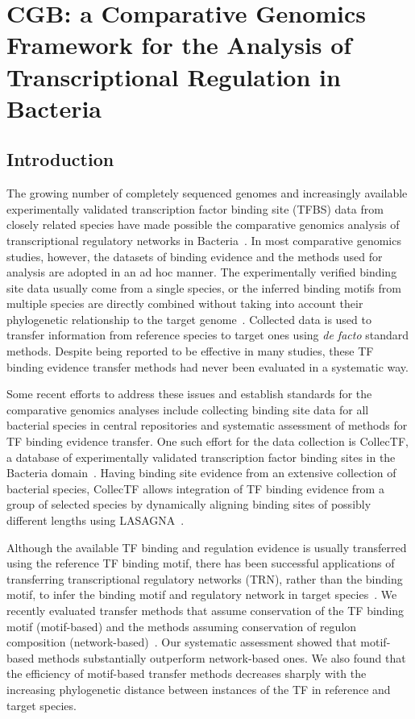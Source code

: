 \chapter{CGB: a Comparative Genomics Framework for the Analysis of
  Transcriptional Regulation in Bacteria}
\label{chap:cgb}
\section{Introduction}

The growing number of completely sequenced genomes and increasingly available
experimentally validated transcription factor binding site (TFBS) data from
closely related species have made possible the comparative genomics analysis of
transcriptional regulatory networks in Bacteria~\citep{makarova2001conservation,
  rodionov2007comparative, babu2004structure}. In most comparative genomics
studies, however, the datasets of binding evidence and the methods used for
analysis are adopted in an ad hoc manner. The experimentally verified binding
site data usually come from a single species, or the inferred binding motifs
from multiple species are directly combined without taking into account their
phylogenetic relationship to the target genome~\citep{erill2004differences,
  novichkov2010regpredict, ravcheev2013genomic, leyn2014comparative,
  kazakov2009comparative, rodionov2008transcriptional}. Collected data is used
to transfer information from reference species to target ones using \textit{de
  facto} standard methods. Despite being reported to be effective in many
studies, these TF binding evidence transfer methods had never been evaluated in
a systematic way.

Some recent efforts to address these issues and establish standards for the
comparative genomics analyses include collecting binding site data for all
bacterial species in central repositories and systematic assessment of methods
for TF binding evidence transfer. One such effort for the data collection is
CollecTF, a database of experimentally validated transcription factor binding
sites in the Bacteria domain~\citep{kilic2013collectf}. Having binding site
evidence from an extensive collection of bacterial species, CollecTF allows
integration of TF binding evidence from a group of selected species by
dynamically aligning binding sites of possibly different lengths using
LASAGNA~\citep{lee2013lasagna}.

Although the available TF binding and regulation evidence is usually
transferred using the reference TF binding motif, there has been successful
applications of transferring transcriptional regulatory networks (TRN), rather
than the binding motif, to infer the binding motif and regulatory network in
target species~\citep{babu2008computational, novichkov2010regpredict}. We
recently evaluated transfer methods that assume conservation of the TF binding
motif (motif-based) and the methods assuming conservation of regulon
composition (network-based)~\citep{kilic2015assessment}. Our systematic
assessment showed that motif-based methods substantially outperform
network-based ones. We also found that the efficiency of motif-based transfer
methods decreases sharply with the increasing phylogenetic distance between
instances of the TF in reference and target species.


